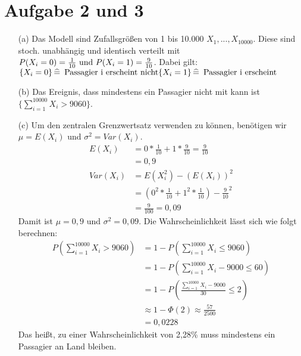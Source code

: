 \documentclass[10pt,a4paper]{article}
\newcommand{\ent}{\mathop{\widehat{=}}}
\begin{document}
\section*{Aufgabe 2 und 3}
\begin{itemize}
\item[(a)] Das Modell sind Zufallsgrößen von 1 bis 10.000 $X_1,...,X_10000$. Diese sind stoch. unabhängig und identisch verteilt mit $P(X_i = 0) = \frac{1}{10} \text{ und }\\
P(X_i=1) = \frac{9}{10}$. Dabei gilt:\\
$\{X_i = 0\} \ent \text{ Passagier i erscheint nicht}\\
\{X_i=1\} \ent \text{ Passagier i erscheint}$
\item[(b)] Das Ereignis, dass mindestens ein Passagier nicht mit kann ist $\{ \sum\nolimits_{i=1}^{10000} X_i > 9060\}$.
\item[(c)] Um den zentralen Grenzwertsatz verwenden zu können, benötigen wir $\mu = E(X_i)$ und $\sigma^2 = Var(X_i)$.\\
\begin{align*}
E(X_i) &= 0*\frac{1}{10} + 1* \frac{9}{10} = \frac{9}{10}\\
&= 0,9 \\
Var(X_i) &= E(X_i^2)-(E(X_i))^2\\
&= (0^2*\frac{1}{10}+1^2*\frac{1}{10})-\frac{9}{10}^2\\
&= \frac{9}{100} = 0,09
\end{align*}
Damit ist $\mu = 0,9$ und $\sigma^2 = 0,09$. Die Wahrscheinlichkeit lässt sich wie folgt berechnen:\\
\begin{align*}
P(\sum\nolimits_{i=1}^{10000} X_i > 9060) &= 1 - P(\sum\nolimits_{i=1}^{10000} X_i \leq 9060)\\
&= 1-P(\sum\nolimits_{i=1}^{10000} X_i-9000 \leq 60)\\
&= 1-P(\frac{\sum\nolimits_{i=1}^{10000} X_i-9000}{30} \leq 2)\\
&\approx 1-\Phi(2) \approx \frac{57}{2500}\\
&= 0,0228
\end{align*}
Das heißt, zu einer Wahrscheinlichkeit von 2,28\% muss mindestens ein Passagier an Land bleiben.
\end{itemize}
\end{document}

